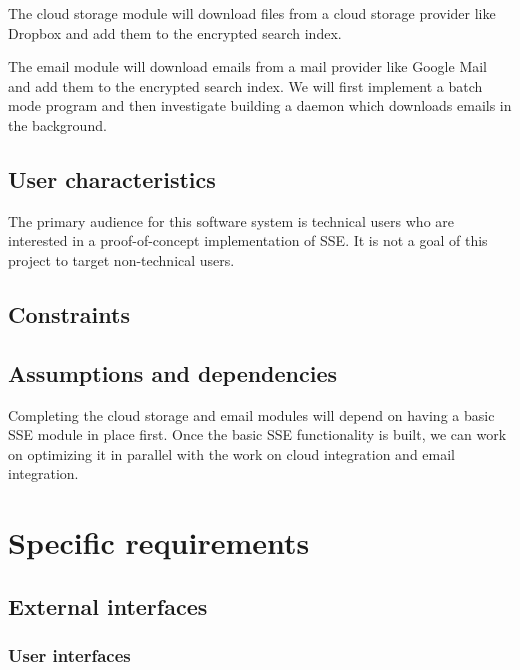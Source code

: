 \documentclass[onecolumn, draftclsnofoot,10pt, compsoc]{IEEEtran}
\begin{document}
The cloud storage module will download files from a cloud storage provider like Dropbox and add them to the encrypted search index.

The email module will download emails from a mail provider like Google Mail and add them to the encrypted search index. We will first implement a batch mode program and then investigate building a daemon which downloads emails in the background.


\subsection{ User characteristics }

The primary audience for this software system is technical users who are interested in a proof-of-concept implementation of SSE. It is not a goal of this project to target non-technical users.

\subsection{ Constraints }


\subsection{ Assumptions and dependencies }

Completing the cloud storage and email modules will depend on having a basic SSE module in place first. Once the basic SSE functionality is built, we can work on optimizing it in parallel with the work on cloud integration and email integration.

\section{ Specific requirements } %

\subsection{ External interfaces }

\subsubsection{ User interfaces }
\end{document}
